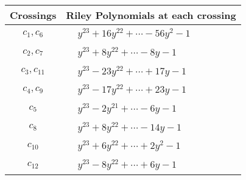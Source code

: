 \documentclass[1p]{elsarticle_modified}
\theoremstyle{definition}
\begin{document}
\begin{tabular}{m{50pt}|m{274pt}}
Crossings & \hspace{64pt}Riley Polynomials at each crossing \\
\hline $$\begin{aligned}c_{1},c_{6}\end{aligned}$$&$\begin{aligned}
&y^{23}+16 y^{22}+\cdots-56 y^2-1
\end{aligned}$\\
\hline $$\begin{aligned}c_{2},c_{7}\end{aligned}$$&$\begin{aligned}
&y^{23}+8 y^{22}+\cdots-8 y-1
\end{aligned}$\\
\hline $$\begin{aligned}c_{3},c_{11}\end{aligned}$$&$\begin{aligned}
&y^{23}-23 y^{22}+\cdots+17 y-1
\end{aligned}$\\
\hline $$\begin{aligned}c_{4},c_{9}\end{aligned}$$&$\begin{aligned}
&y^{23}-17 y^{22}+\cdots+23 y-1
\end{aligned}$\\
\hline $$\begin{aligned}c_{5}\end{aligned}$$&$\begin{aligned}
&y^{23}-2 y^{21}+\cdots-6 y-1
\end{aligned}$\\
\hline $$\begin{aligned}c_{8}\end{aligned}$$&$\begin{aligned}
&y^{23}+8 y^{22}+\cdots-14 y-1
\end{aligned}$\\
\hline $$\begin{aligned}c_{10}\end{aligned}$$&$\begin{aligned}
&y^{23}+6 y^{22}+\cdots+2 y^2-1
\end{aligned}$\\
\hline $$\begin{aligned}c_{12}\end{aligned}$$&$\begin{aligned}
&y^{23}-8 y^{22}+\cdots+6 y-1
\end{aligned}$\\
\hline
\end{tabular}\\~\\
\end{document}
